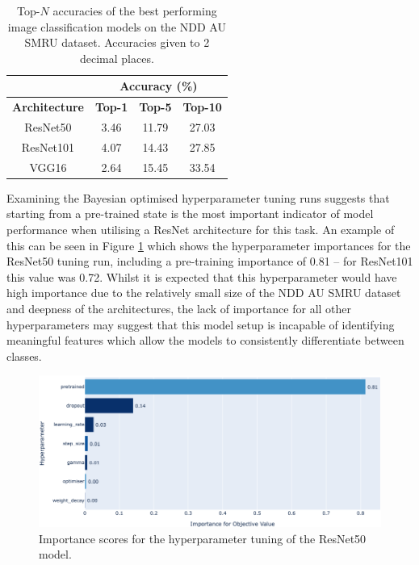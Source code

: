 \begin{table}[]
	\centering
	\small
		\begin{tabular}{cccc}
			\cline{2-4}
			 & \multicolumn{3}{c}{\textbf{Accuracy (\%)}} \\ \hline
			\textbf{Architecture}                    &  \textbf{Top-1} & \textbf{Top-5} & \textbf{Top-10} \\ \hline
			ResNet50 \cite{he_deep_2015}   &  3.46                 & 11.79            & 27.03                  \\
			ResNet101 \cite{he_deep_2015}   &  4.07                  &   14.43               &  27.85                     \\
			VGG16 \cite{simonyan_very_2015} & 2.64                &    15.45              &   33.54     \\\bottomrule
	\end{tabular}
	\caption[Top-$N$ accuracies of the best performing image classification models on the NDD AU SMRU dataset.]{Top-$N$ accuracies of the best performing image classification models on the NDD AU SMRU dataset. Accuracies given to 2 decimal places.}
	\label{tab:optunaBestParamsStandard}
\end{table}

Examining the Bayesian optimised hyperparameter tuning runs suggests that starting from a pre-trained state is the most important indicator of model performance when utilising a ResNet architecture for this task. An example of this can be seen in Figure \ref{fig:resnet50baseline-hyperparam-importance-optuna} which shows the hyperparameter importances for the ResNet50 tuning run, including a pre-training importance of 0.81 -- for ResNet101 this value was 0.72. Whilst it is expected that this hyperparameter would have high importance due to the relatively small size of the NDD AU SMRU dataset and deepness of the architectures, the lack of importance for all other hyperparameters may suggest that this model setup is incapable of identifying meaningful features which allow the models to consistently differentiate between classes. 

\begin{figure}
	\begin{center}
		\includegraphics[scale=0.4]{Chapter6/figs/resnet50baseline-hyperparam-importance-optuna.png}
	\end{center}
	\caption{Importance scores for the hyperparameter tuning of the ResNet50 model.}
	\label{fig:resnet50baseline-hyperparam-importance-optuna}
\end{figure}

